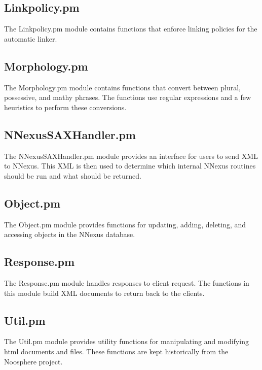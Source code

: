 \documentclass{article}
\begin{document}
\subsection{Linkpolicy.pm}
The Linkpolicy.pm module contains functions that enforce linking policies for
the automatic linker.

\subsection{Morphology.pm}
The Morphology.pm module contains functions that convert between plural, possessive, and mathy phrases. The functions use regular expressions and
a few heuristics to perform these conversions.

\subsection{NNexusSAXHandler.pm}
The NNexusSAXHandler.pm module provides an interface for users to send XML
to NNexus. This XML is then used to determine which internal NNexus routines
should be run and what should be returned.

\subsection{Object.pm}
The Object.pm module provides functions for updating, adding, deleting,
and accessing objects in the NNexus database.

\subsection{Response.pm}
The Response.pm module handles responses to client request. The functions
in this module build XML documents to return back to the clients.

\subsection{Util.pm}
The Util.pm module provides utility functions for manipulating and modifying
html documents and files. These functions are kept historically from the Noosphere project.
\end{document}
